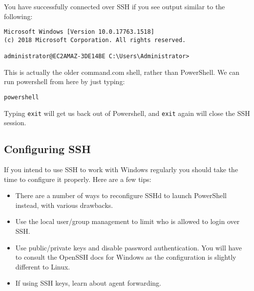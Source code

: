 You have successfully connected over SSH if you see output similar to
the following:

\begin{verbatim}
Microsoft Windows [Version 10.0.17763.1518]
(c) 2018 Microsoft Corporation. All rights reserved.

administrator@EC2AMAZ-3DE14BE C:\Users\Administrator>
\end{verbatim}

This is actually the older command.com shell, rather than PowerShell. We
can run powershell from here by just typing:

\begin{verbatim}
powershell
\end{verbatim}

Typing \texttt{exit} will get us back out of Powershell, and
\texttt{exit} again will close the SSH session.

\subsection{Configuring SSH}\label{configuring-ssh}

If you intend to use SSH to work with Windows regularly you should take
the time to configure it properly. Here are a few tips:

\begin{itemize}
\item
  There are a number of ways to reconfigure SSHd to launch PowerShell
  instead, with various drawbacks.
\item
  Use the local user/group management to limit who is allowed to login
  over SSH.
\item
  Use public/private keys and disable password authentication. You will
  have to consult the OpenSSH docs for Windows as the configuration is
  slightly different to Linux.
\item
  If using SSH keys, learn about agent forwarding.
\end{itemize}

